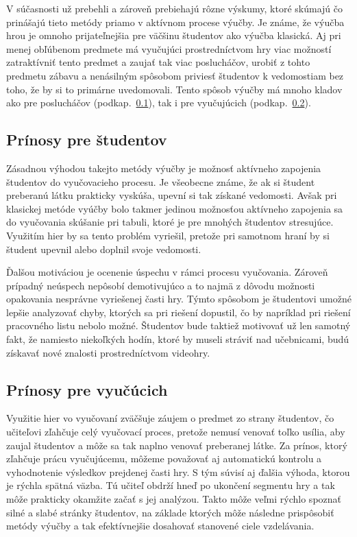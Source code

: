 \documentclass[10pt,twoside,slovak,a4paper]{article}
\begin{document}
V súčasnosti už prebehli a zároveň prebiehajú rôzne výskumy, ktoré skúmajú čo prinášajú tieto metódy priamo v aktívnom procese výučby\cite{Chen2012-ao}. Je známe, že výučba hrou je omnoho prijateľnejšia pre väčšinu študentov ako výučba klasická. Aj pri menej obľúbenom predmete má vyučujúci prostredníctvom hry viac možností zatraktívniť tento predmet a zaujať tak viac poslucháčov, urobiť z tohto predmetu zábavu a nenásilným spôsobom priviesť študentov k vedomostiam bez toho, že by si to primárne uvedomovali. Tento spôsob výučby má mnoho kladov ako pre poslucháčov (podkap.~\ref{vyhody:studenti}), tak i pre vyučujúcich (podkap.~\ref{vyhody:vyucujuci}).

\subsection{Prínosy pre študentov} \label{vyhody:studenti}

Zásadnou výhodou takejto metódy výučby je možnosť aktívneho zapojenia študentov do vyučovacieho procesu. Je všeobecne známe, že ak si študent preberanú látku prakticky vyskúša, upevní si tak získané vedomosti. Avšak pri klasickej metóde vyúčby bolo takmer jedinou možnosťou aktívneho zapojenia sa do vyučovania skúšanie pri tabuli, ktoré je pre mnohých študentov stresujúce. Využitím hier by sa tento problém vyriešil, pretože pri samotnom hraní by si študent upevnil alebo doplnil svoje vedomosti.

 Ďalšou motiváciou je ocenenie úspechu v rámci procesu vyučovania. Zároveň prípadný neúspech nepôsobí demotivujúco a to najmä z dôvodu možnosti opakovania nesprávne vyriešenej časti hry. Týmto spôsobom je študentovi umožné lepšie analyzovať chyby, ktorých sa pri riešení dopustil, čo by napríklad pri riešení pracovného listu nebolo možné. Študentov bude taktiež motivovať už len samotný fakt, že namiesto niekoľkých hodín, ktoré by museli stráviť nad učebnicami, budú získavať nové znalosti prostredníctvom videohry\cite{7930309}. 



\subsection{Prínosy pre vyučúcich} \label{vyhody:vyucujuci}

Využitie hier vo vyučovaní zväčšuje záujem o predmet zo strany študentov\cite{Ucenie}, čo učiteľovi zľahčuje celý vyučovací proces, pretože nemusí venovať toľko usília, aby zaujal študentov a môže sa tak naplno venovať preberanej látke. Za prínos, ktorý zľahčuje prácu vyučujúcemu, môžeme považovať aj automatickú kontrolu a vyhodnotenie výsledkov prejdenej časti hry. S tým súvisí aj ďalšia výhoda, ktorou je rýchla spätná väzba. Tú učiteľ obdrží hneď po ukončení segmentu hry a tak môže prakticky okamžite začať s jej analýzou. Takto môže veľmi rýchlo spoznať silné a slabé stránky študentov, na základe ktorých môže následne prispôsobiť metódy výučby a tak efektívnejšie dosahovať stanovené ciele vzdelávania.
\end{document}
